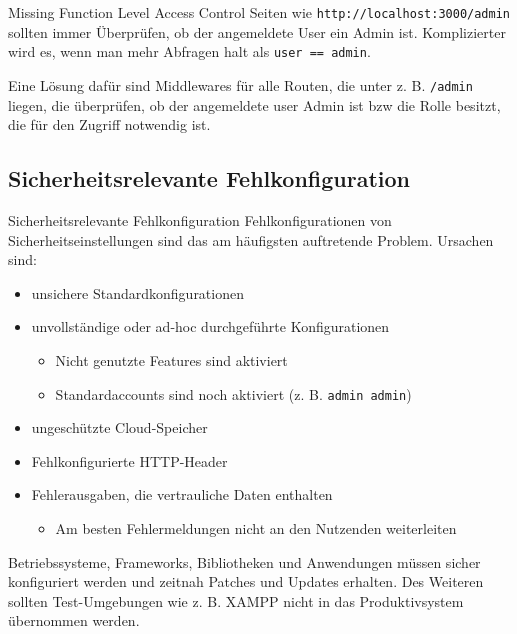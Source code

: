 \begin{example}{Missing Function Level Access Control}
    Seiten wie \texttt{http://localhost:3000/admin} sollten immer Überprüfen, ob der angemeldete User ein Admin ist.
    Komplizierter wird es, wenn man mehr Abfragen halt als \texttt{user == admin}.

    Eine Lösung dafür sind Middlewares für alle Routen, die unter z. B. \texttt{/admin} liegen, die überprüfen, ob der angemeldete user Admin ist bzw die Rolle besitzt, die für den Zugriff notwendig ist.
\end{example}

\subsection{Sicherheitsrelevante Fehlkonfiguration}

\begin{defi}{Sicherheitsrelevante Fehlkonfiguration}
    Fehlkonfigurationen von Sicherheitseinstellungen sind das am häufigsten auftretende Problem.
    Ursachen sind:
    \begin{itemize}
        \item unsichere Standardkonfigurationen
        \item unvollständige oder ad-hoc durchgeführte Konfigurationen
              \begin{itemize}
                  \item Nicht genutzte Features sind aktiviert
                  \item Standardaccounts sind noch aktiviert (z. B. \texttt{admin admin})
              \end{itemize}
        \item ungeschützte Cloud-Speicher
        \item Fehlkonfigurierte HTTP-Header
        \item Fehlerausgaben, die vertrauliche Daten enthalten
              \begin{itemize}
                  \item Am besten Fehlermeldungen nicht an den Nutzenden weiterleiten
              \end{itemize}
    \end{itemize}

    Betriebssysteme, Frameworks, Bibliotheken und Anwendungen müssen sicher konfiguriert werden und zeitnah Patches und Updates erhalten.
    Des Weiteren sollten Test-Umgebungen wie z. B. XAMPP nicht in das Produktivsystem übernommen werden.
\end{defi}

